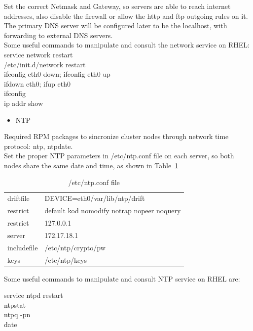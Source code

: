 \documentclass[a4paper, 12pt]{book}
\begin{document}
\noindent Set the correct Netmask and Gateway, so servers are able to reach internet addresses, also disable the firewall or allow the http and ftp outgoing rules on it. The primary DNS server will be configured later to be the localhost, with forwarding to external DNS servers.\\

\noindent Some useful commands to manipulate and consult the network service on RHEL:\\

\noindent service network restart\\
/etc/init.d/network restart\\
ifconfig eth0 down; ifconfig eth0 up\\
ifdown eth0; ifup eth0\\
ifconfig\\
ip addr show\\

\begin{itemize}
	\item NTP
\end{itemize}

\noindent Required RPM packages to sincronize cluster nodes through network time protocol: ntp, ntpdate.\\

\noindent Set the proper NTP parameters in /etc/ntp.conf file on each server, so both nodes share the same date and time, as shown in Table~\ref{table:ntp}\\

\begin{table}
  \centering
  \begin{tabular}{ | l l | }
    \hline
    driftfile & DEVICE=eth0/var/lib/ntp/drift \\
	restrict & default kod nomodify notrap nopeer noquery \\
    restrict & 127.0.0.1 \\
    server & 172.17.18.1 \\
    includefile & /etc/ntp/crypto/pw \\
    keys & /etc/ntp/keys \\
    \hline
  \end{tabular}
\caption{/etc/ntp.conf file}
\label{table:ntp}
\end{table}

\noindent Some useful commands to manipulate and consult NTP service on RHEL are:

service ntpd restart \\
ntpstat \\
ntpq -pn \\
date\\
\end{document}
